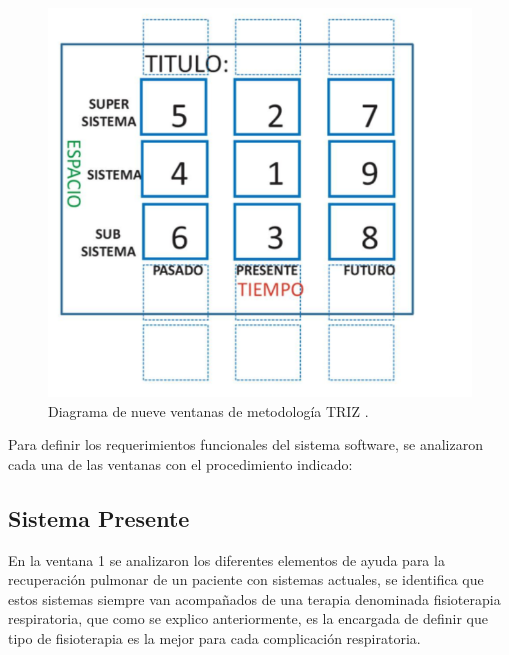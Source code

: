 \documentclass[12pt]{article}
\begin{document}
\begin{figure}[ht]
\centering
\includegraphics[scale=0.45]{imag/9ventanas.png}
\caption{Diagrama de nueve ventanas de metodología TRIZ \cite{37}. }
\label{6}
\end{figure}
\FloatBarrier


Para definir los requerimientos funcionales del sistema software, se analizaron cada una de las ventanas con el procedimiento indicado:

\subsection{Sistema Presente} 

En la ventana 1 se analizaron los diferentes elementos de ayuda para la recuperación pulmonar de un paciente con sistemas actuales, se identifica que estos sistemas siempre van acompañados de una terapia denominada fisioterapia respiratoria, que como se explico anteriormente, es la encargada de definir que tipo de fisioterapia es la mejor para cada complicación respiratoria.

\end{document}
